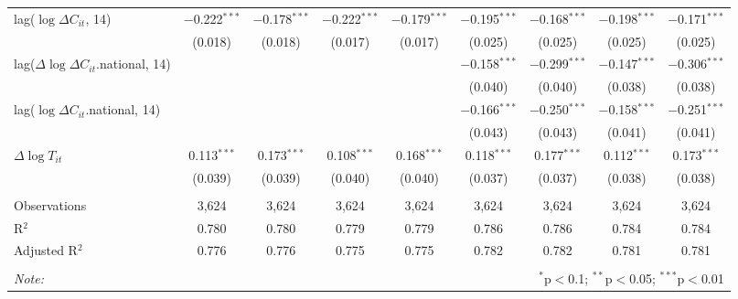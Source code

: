 \begin{tabular}{@{\extracolsep{1pt}}lcccccccc}
  lag($\log \Delta C_{it}$, 14) & $-$0.222$^{***}$ & $-$0.178$^{***}$ & $-$0.222$^{***}$ & $-$0.179$^{***}$ & $-$0.195$^{***}$ & $-$0.168$^{***}$ & $-$0.198$^{***}$ & $-$0.171$^{***}$ \\ 
  & (0.018) & (0.018) & (0.017) & (0.017) & (0.025) & (0.025) & (0.025) & (0.025) \\ 
  lag($\Delta \log \Delta C_{it}$.national, 14) &  &  &  &  & $-$0.158$^{***}$ & $-$0.299$^{***}$ & $-$0.147$^{***}$ & $-$0.306$^{***}$ \\ 
  &  &  &  &  & (0.040) & (0.040) & (0.038) & (0.038) \\ 
  lag($\log \Delta C_{it}$.national, 14) &  &  &  &  & $-$0.166$^{***}$ & $-$0.250$^{***}$ & $-$0.158$^{***}$ & $-$0.251$^{***}$ \\ 
  &  &  &  &  & (0.043) & (0.043) & (0.041) & (0.041) \\ 
  $\Delta \log T_{it}$ & 0.113$^{***}$ & 0.173$^{***}$ & 0.108$^{***}$ & 0.168$^{***}$ & 0.118$^{***}$ & 0.177$^{***}$ & 0.112$^{***}$ & 0.173$^{***}$ \\ 
  & (0.039) & (0.039) & (0.040) & (0.040) & (0.037) & (0.037) & (0.038) & (0.038) \\ 
 \hline \\[-1.8ex] 
Observations & 3,624 & 3,624 & 3,624 & 3,624 & 3,624 & 3,624 & 3,624 & 3,624 \\ 
R$^{2}$ & 0.780 & 0.780 & 0.779 & 0.779 & 0.786 & 0.786 & 0.784 & 0.784 \\ 
Adjusted R$^{2}$ & 0.776 & 0.776 & 0.775 & 0.775 & 0.782 & 0.782 & 0.781 & 0.781 \\ 
\hline 
\hline \\[-1.8ex] 
\textit{Note:}  & \multicolumn{8}{r}{$^{*}$p$<$0.1; $^{**}$p$<$0.05; $^{***}$p$<$0.01} \\ 
\end{tabular} 